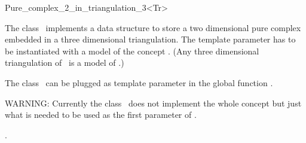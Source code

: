 

\begin{ccRefClass}{Pure_complex_2_in_triangulation_3<Tr>}  %


\ccDefinition
  
The class \ccRefName\  implements a data structure to store
a two dimensional pure  complex 
embedded in a three dimensional triangulation.
The template parameter  has to be instantiated
with a model of the concept .
(Any three dimensional   triangulation of
\cgal\ is a model of .)

The class \ccRefName\  can be plugged as template parameter
in the global function .




\ccIsModel


WARNING: 
Currently the class  \ccRefName\  does not implement the
whole concept 
but just what is needed to  be used as the first  parameter 
of  .








\ccSeeAlso

.



\end{ccRefClass}
